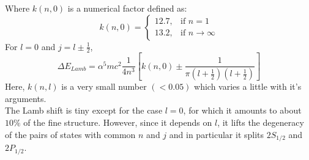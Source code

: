 Where $k(n,0)$ is a numerical factor defined as:
$$k(n,0) = \begin{cases}
12.7, & \text{if } n = 1\\
13.2,              & \text{if } n \rightarrow \infty
\end{cases} $$
For $ l = 0$ and $j = l \pm \frac{1}{2}$,
\begin{equation}
\Delta E_{Lamb} = \alpha^{5}mc^{2}\frac{1}{4n^{3}}\left[ k(n,0) \pm \frac{1}{\pi (l + \frac{1}{2}) (l + \frac{1}{2})} \right]
\end{equation}
Here, $k(n,l)$ is a very small number $(< 0.05)$ which varies a little with it's arguments.\\
The Lamb shift is tiny except for the case $l=0$, for which it amounts to about $10 \% $ of the fine structure. However, since it depends on $l$, it lifts the degeneracy of the pairs of states with common $n$ and $j$ and in particular it splits $2 S_{1/2}$ and $2 P_{1/2}$.
